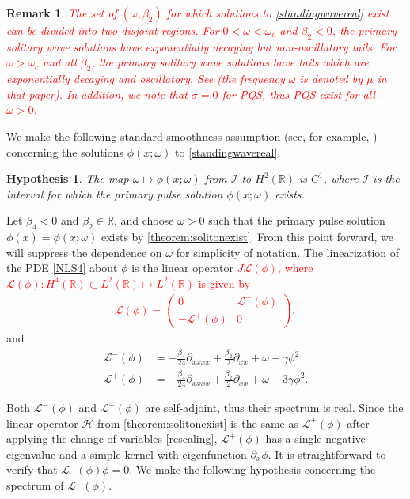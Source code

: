 \documentclass[12pt]{elsarticle}
\def\noi{\noindent}
\def\R{{\mathbb R}}
\def\calH{{\mathcal H}}
\def\calL{{\mathcal L}}
\def\calI{{\mathcal I}}
\newtheorem{hypothesis}{Hypothesis}
\newtheorem{remark}{Remark}
\newcommand{\revised}[1]{ \textcolor{red}{#1} }
\begin{document}
\begin{remark}\label{remark:soliton}
\revised{The set of $(\omega, \beta_2)$ for which solutions to \cref{standingwavereal} exist can be divided into two disjoint regions. For $0 < \omega < \omega_c$ and $\beta_2 < 0$, the primary solitary wave solutions have exponentially decaying but non-oscillatory tails. For $\omega > \omega_c$ and all $\beta_2$, the primary solitary wave solutions have tails which are exponentially decaying and oscillatory. See \cite[Figure 2(a)]{Tam2020} (the frequency $\omega$ is denoted by $\mu$ in that paper). In addition, we note that $\sigma = 0$ for PQS, thus PQS exist for all $\omega > 0$.} 
\end{remark}

\noi We make the following standard smoothness assumption (see, for example, \cite[Assumption 2]{Grillakis1987}) concerning the solutions $\phi(x; \omega)$ to \cref{standingwavereal}.

\begin{hypothesis}\label{hyp:smoothmap}
The map $\omega \mapsto \phi(x; \omega)$ from $\calI$ to $H^2(\R)$ is $C^1$, where $\calI$ is the interval for which the primary pulse solution $\phi(x; \omega)$ exists.
\end{hypothesis}

Let $\beta_4 < 0$ and $\beta_2 \in \R$, and choose $\omega > 0$ such that the primary pulse solution $\phi(x) = \phi(x; \omega)$ exists by \cref{theorem:solitonexist}. From this point forward, we will suppress the dependence on $\omega$ for simplicity of notation. The linearization of the PDE \cref{NLS4} about $\phi$ is the linear operator \revised{$J \calL(\phi)$, where $\calL(\phi): H^4(\R) \subset L^2(\R) \mapsto L^2(\R)$ is given by
\begin{align}\label{defLphi}
\calL(\phi) = 
\begin{pmatrix}
0 & \calL^-(\phi) \\
-\calL^+(\phi) & 0
\end{pmatrix},
\end{align}
}
and
\begin{align*}
\calL^-(\phi) &= -\frac{\beta_4}{24} \partial_{xxxx} + \frac{\beta_2}{2} \partial_{xx} + \omega - \gamma \phi^2 \\
\calL^+(\phi) &= -\frac{\beta_4}{24} \partial_{xxxx} + \frac{\beta_2}{2} \partial_{xx} + \omega - 3 \gamma \phi^2.
\end{align*}

Both $\calL^-(\phi)$ and $\calL^+(\phi)$ are self-adjoint, thus their spectrum is real. Since the linear operator $\calH$ from \cref{theorem:solitonexist} is the same as $\calL^+(\phi)$ after applying the change of variables \cref{rescaling}, $\calL^+(\phi)$ has a single negative eigenvalue and a simple kernel with eigenfunction $\partial_x \phi$. It is straightforward to verify that $\calL^-(\phi) \phi = 0$. We make the following hypothesis concerning the spectrum of $\calL^-(\phi)$.
\end{document}
